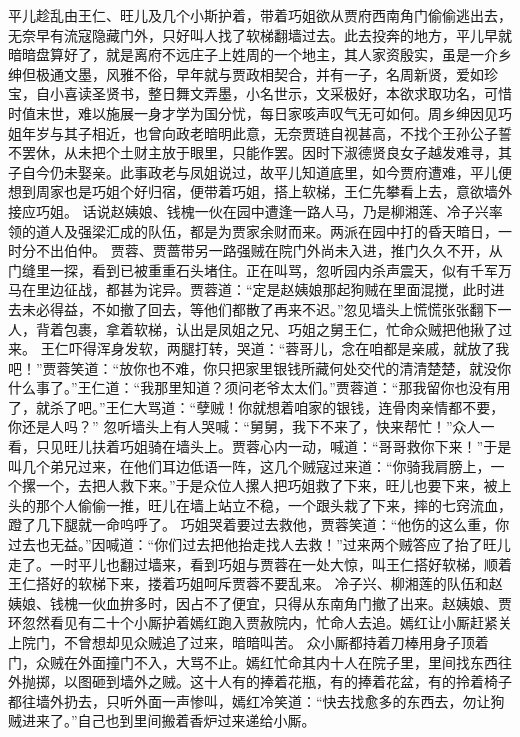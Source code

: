 \documentclass[12pt,oneside]{book}
\begin{document}
平儿趁乱由王仁、旺儿及几个小斯护着，带着巧姐欲从贾府西南角门偷偷逃出去，无奈早有流寇隐藏门外，只好叫人找了软梯翻墙过去。此去投奔的地方，平儿早就暗暗盘算好了，就是离府不远庄子上姓周的一个地主，其人家资殷实，虽是一介乡绅但极通文墨，风雅不俗，早年就与贾政相契合，并有一子，名周新贤，爱如珍宝，自小喜读圣贤书，整日舞文弄墨，小名世示，文采极好，本欲求取功名，可惜时值末世，难以施展一身才学为国分忧，每日家咳声叹气无可如何。周乡绅因见巧姐年岁与其子相近，也曾向政老暗明此意，无奈贾琏自视甚高，不找个王孙公子誓不罢休，从未把个土财主放于眼里，只能作罢。因时下淑德贤良女子越发难寻，其子自今仍未娶亲。此事政老与凤姐说过，故平儿知道底里，如今贾府遭难，平儿便想到周家也是巧姐个好归宿，便带着巧姐，搭上软梯，王仁先攀看上去，意欲墙外接应巧姐。
话说赵姨娘、钱槐一伙在园中遭逢一路人马，乃是柳湘莲、冷子兴率领的道人及强梁汇成的队伍，都是为贾家余财而来。两派在园中打的昏天暗日，一时分不出伯仲。
贾蓉、贾蔷带另一路强贼在院门外尚未入进，推门久久不开，从门缝里一探，看到已被重重石头堵住。正在叫骂，忽听园内杀声震天，似有千军万马在里边征战，都甚为诧异。贾蓉道：“定是赵姨娘那起狗贼在里面混搅，此时进去未必得益，不如撤了回去，等他们都散了再来不迟。”忽见墙头上慌慌张张翻下一人，背着包裹，拿着软梯，认出是凤姐之兄、巧姐之舅王仁，忙命众贼把他揪了过来。
王仁吓得浑身发软，两腿打转，哭道：“蓉哥儿，念在咱都是亲戚，就放了我吧！”贾蓉笑道：“放你也不难，你只把家里银钱所藏何处交代的清清楚楚，就没你什么事了。”王仁道：“我那里知道？须问老爷太太们。”贾蓉道：“那我留你也没有用了，就杀了吧。”王仁大骂道：“孽贼！你就想着咱家的银钱，连骨肉亲情都不要，你还是人吗？”
忽听墙头上有人哭喊：“舅舅，我下不来了，快来帮忙！”众人一看，只见旺儿扶着巧姐骑在墙头上。贾蓉心内一动，喊道：“哥哥救你下来！”于是叫几个弟兄过来，在他们耳边低语一阵，这几个贼寇过来道：“你骑我肩膀上，一个摞一个，去把人救下来。”于是众位人摞人把巧姐救了下来，旺儿也要下来，被上头的那个人偷偷一推，旺儿在墙上站立不稳，一个跟头栽了下来，摔的七窍流血，蹬了几下腿就一命呜呼了。
巧姐哭着要过去救他，贾蓉笑道：“他伤的这么重，你过去也无益。”因喊道：“你们过去把他抬走找人去救！”过来两个贼答应了抬了旺儿走了。一时平儿也翻过墙来，看到巧姐与贾蓉在一处大惊，叫王仁搭好软梯，顺着王仁搭好的软梯下来，搂着巧姐呵斥贾蓉不要乱来。
冷子兴、柳湘莲的队伍和赵姨娘、钱槐一伙血拚多时，因占不了便宜，只得从东南角门撤了出来。赵姨娘、贾环忽然看见有二十个小厮护着嫣红跑入贾赦院内，忙命人去追。嫣红让小厮赶紧关上院门，不曾想却见众贼追了过来，暗暗叫苦。
众小厮都持着刀棒用身子顶着门，众贼在外面撞门不入，大骂不止。嫣红忙命其内十人在院子里，里间找东西往外抛掷，以图砸到墙外之贼。这十人有的捧着花瓶，有的捧着花盆，有的拎着椅子都往墙外扔去，只听外面一声惨叫，嫣红冷笑道：“快去找愈多的东西去，勿让狗贼进来了。”自己也到里间搬着香炉过来递给小厮。
\end{document}
